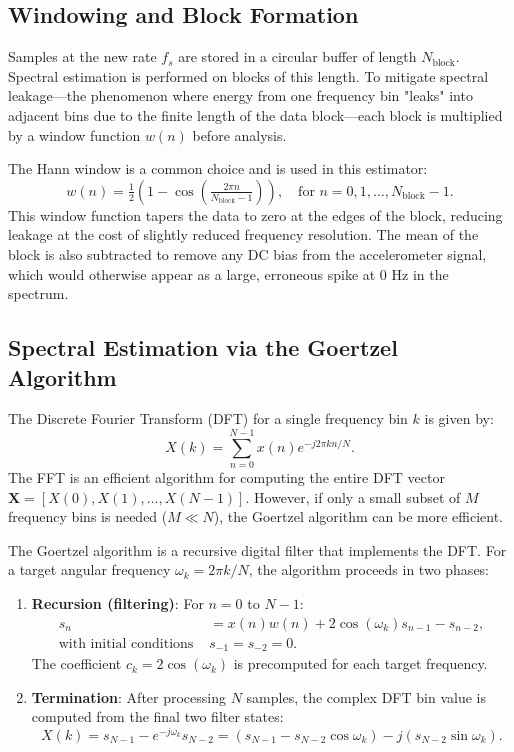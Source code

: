 \documentclass[11pt,letterpaper]{article}
\begin{document}
\subsection{Windowing and Block Formation}
Samples at the new rate $f_s$ are stored in a circular buffer of length $N_\text{block}$. Spectral estimation is performed on blocks of this length. To mitigate spectral leakage—the phenomenon where energy from one frequency bin "leaks" into adjacent bins due to the finite length of the data block—each block is multiplied by a window function $w(n)$ before analysis.

The Hann window is a common choice and is used in this estimator:
\begin{equation}
w(n) = \tfrac{1}{2}\left(1 - \cos\left(\tfrac{2\pi n}{N_\text{block}-1}\right)\right), \quad \text{for } n = 0, 1, \dots, N_\text{block}-1.
\end{equation}
This window function tapers the data to zero at the edges of the block, reducing leakage at the cost of slightly reduced frequency resolution. The mean of the block is also subtracted to remove any DC bias from the accelerometer signal, which would otherwise appear as a large, erroneous spike at 0 Hz in the spectrum.

\subsection{Spectral Estimation via the Goertzel Algorithm}
\label{subsec:goertzel}
The Discrete Fourier Transform (DFT) for a single frequency bin $k$ is given by:
\begin{equation}
X(k) = \sum_{n=0}^{N-1} x(n) e^{-j 2\pi k n / N}.
\end{equation}
The FFT is an efficient algorithm for computing the entire DFT vector $\mathbf{X} = [X(0), X(1), \dots, X(N-1)]$. However, if only a small subset of $M$ frequency bins is needed ($M \ll N$), the Goertzel algorithm can be more efficient.

The Goertzel algorithm is a recursive digital filter that implements the DFT. For a target angular frequency $\omega_k = 2\pi k / N$, the algorithm proceeds in two phases:
\begin{enumerate}
    \item \textbf{Recursion (filtering)}: For $n = 0$ to $N-1$:
    \begin{align}
    s_n &= x(n) w(n) + 2 \cos(\omega_k) s_{n-1} - s_{n-2}, \\
    \text{with initial conditions } & s_{-1} = s_{-2} = 0.
    \end{align}
    The coefficient $c_k = 2\cos(\omega_k)$ is precomputed for each target frequency.
    \item \textbf{Termination}: After processing $N$ samples, the complex DFT bin value is computed from the final two filter states:
    \begin{equation}
    X(k) = s_{N-1} - e^{-j\omega_k} s_{N-2} = (s_{N-1} - s_{N-2}\cos\omega_k) - j (s_{N-2}\sin\omega_k).
    \end{equation}
\end{enumerate}
\end{document}

